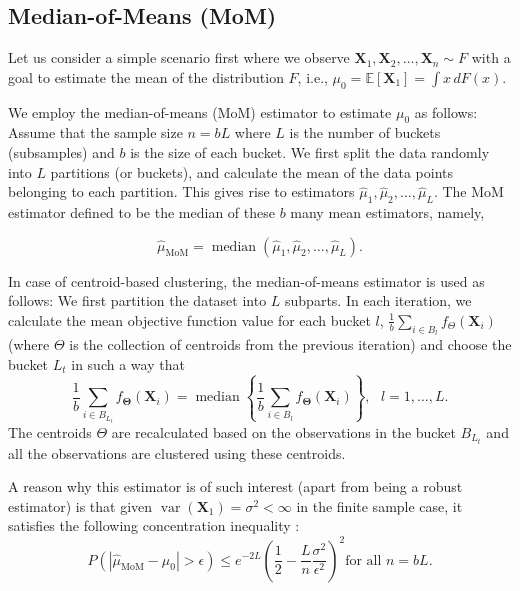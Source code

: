\documentclass[11pt]{article}
\newcommand{\bX}{\boldsymbol{X}}
\newcommand{\bTheta}{\boldsymbol{\Theta}}
\begin{document}
\subsection{Median-of-Means (MoM)}

Let us consider a simple scenario first where we observe $\bX_1,\bX_2,\ldots,\bX_n\sim F$ with a goal to estimate the mean of the distribution $F$, i.e., $\mu_0=\mathbb{E} [\bX_1]=\int x\,dF(x)$.

We employ the median-of-means (MoM) estimator to estimate $\mu_0$ as follows: Assume that the sample size $n=bL$ where $L$ is the number of buckets (subsamples) and $b$ is the size of each bucket. We first split the data randomly into $L$ partitions (or buckets), and calculate the mean of the data points belonging to each partition. This gives rise to estimators $\hat{\mu}_1,\hat{\mu}_2,\ldots,\hat{\mu}_L$. The MoM estimator defined to be the median of these $b$ many mean estimators, namely,

\begin{equation}\label{MoM-defn}
\hat{\mu}_{\text{MoM}}=\operatorname{median} (\hat{\mu}_1,\hat{\mu}_2,\ldots,\hat{\mu}_L).
\end{equation}

In case of centroid-based clustering, the median-of-means estimator is used as follows: We first partition the dataset into $L$ subparts. In each iteration, we calculate the mean objective function value for each bucket $l$, $\frac{1}{b}\sum_{i \in B_{l}}f_{{\Theta}}(\bX_i)$ (where $\Theta$ is the collection of centroids from the previous iteration) and choose the bucket $L_t$ in such a way that
\begin{equation}\label{eq4}
    \frac{1}{b}\sum_{i \in B_{L_t}}f_{{\bTheta}}(\bX_i)=\operatorname{median}\left\{\displaystyle \frac{1}{b}\sum_{i \in B_{l}}f_{{\bTheta}}(\bX_i)\right\},\text{ }l=1,\ldots,L.
\end{equation}
The centroids $\Theta$ are recalculated based on the observations in the bucket $B_{L_t}$ and all the observations are clustered using these centroids.

A reason why this estimator is of such interest (apart from being a robust estimator) is that given $\operatorname{var}(\bX_1)=\sigma^2<\infty$ in the finite sample case, it satisfies the following concentration inequality \citep{lerasle2019lecture}: 
\begin{equation}
    P(|\hat{\mu}_\text{MoM}-\mu_0| > \epsilon) \leqslant e^{-2L} \left(\frac{1}{2}-\frac{L}{n}\frac{\sigma^2}{\epsilon^2}\right)^2 \text{for all } n=bL.
\end{equation}
\end{document}
